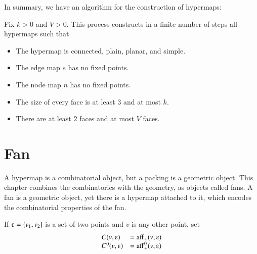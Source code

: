 In summary, we have an algorithm for the construction of hypermaps:

\begin{lemma}  Fix $k>0$ and $V>0$.
This process constructs in a finite number of steps all hypermaps such that
\begin{itemize}
\item The hypermap is connected, plain, planar, and simple.
\item The edge map $e$ has no fixed points.
\item The node map $n$ has no fixed points.
\item The size of every face is at least $3$ and at most $k$.
\item There are at least $2$ faces and at most $V$ faces.
\end{itemize}
\end{lemma}









\chapter{Fan}\label{sec:fan}

A hypermap is a combinatorial object, but a packing
is a geometric object.  This chapter combines the combinatorics
with the geometry, as objects called fans.  A fan is a geometric
object, yet there is a hypermap attached to it,
which encodes the combinatorial properties of the fan.



If $\e=\{v_1,v_2\}$ is a set of two points and $v$ is any other point,
set
  $$
  \begin{array}{lll}
  C(v,\e) &= \op{aff}_+(v,\e)\\
  C^0(v,\e) &= \op{aff}^0_+(v,\e)\\
  \end{array}
  $$

